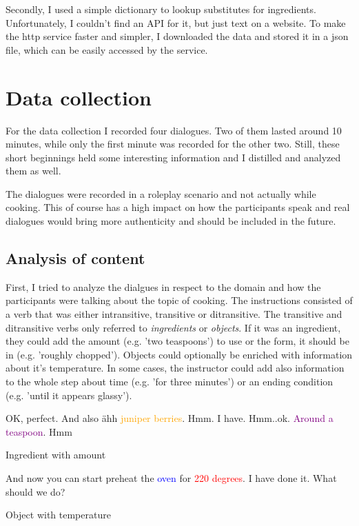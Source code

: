 \documentclass[
	11pt, %
]{fphw}
\newenvironment{captionedDialogue}
    {\captionsetup{
        type=Dialogue,
        skip=2pt,
        belowskip=15pt
        }
    }
    {}
\newenvironment{mydialogue}
    {\begin{snugshade}
     \hrulefill
     \begin{dialogue}}
    {\end{dialogue}
     \hrulefill
     \end{snugshade}}
\begin{document}
Secondly, I used a simple dictionary to lookup substitutes for ingredients. Unfortunately, I couldn't find an API for it, but just text on a website. To make the http service faster and simpler, I downloaded the data and stored it in a json file, which can be easily accessed by the service.

\section*{Data collection}
For the data collection I recorded four dialogues. Two of them lasted around 10 minutes, while only the first minute was recorded for the other two. Still, these short beginnings held some interesting information and I distilled and analyzed them as well.

The dialogues were recorded in a roleplay scenario and not actually while cooking. This of course has a high impact on how the participants speak and real dialogues would bring more authenticity and should be included in the future.

\subsection*{Analysis of content}
First, I tried to analyze the dialgues in respect to the domain and how the participants were talking about the topic of cooking. The instructions consisted of a verb that was either intransitive, transitive or ditransitive. The transitive and ditransitive verbs only referred to \emph{ingredients} or \emph{objects}. If it was an ingredient, they could add the amount (e.g. 'two teaspoons') to use or the form, it should be in (e.g. 'roughly chopped'). Objects could optionally be enriched with information about it's temperature. 
In some cases, the instructor could add also information to the whole step about time (e.g. 'for three minutes') or an ending condition (e.g. 'until it appears glassy').


\begin{captionedDialogue}
    \begin{mydialogue}
         OK, perfect. And also ähh \textcolor{orange}{juniper berries}. 
         Hmm. I have.
         Hmm..ok. \textcolor{purple}{Around a teaspoon}.
         Hmm
    \end{mydialogue}
    \caption{Ingredient with amount}
    \label{dia:ingredient}
\end{captionedDialogue}

\begin{captionedDialogue}
    \begin{mydialogue}
         And now you can start preheat the \textcolor{blue}{oven} for \textcolor{red}{220 degrees}. 
         I have done it. What should we do? 
    \end{mydialogue}
    \caption{Object with temperature}
    \label{dia:object}
\end{captionedDialogue}
\end{document}
